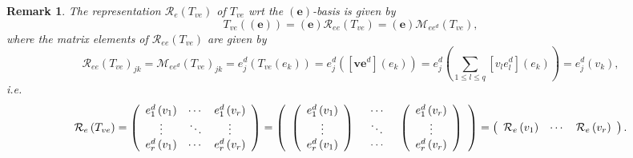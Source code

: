 \documentclass[aps,preprint]{revtex4}%
\newtheorem{remark}[theorem]{Remark}
\begin{document}
\begin{remark}
The representation $\mathcal{R}_{e}\left(  T_{ve}\right)  $ of $T_{ve}$ wrt
the $\left(  \mathbf{e}\right)  $-basis is given by
\begin{equation}
T_{ve}\left(  \left(  \mathbf{e}\right)  \right)  =\left(  \mathbf{e}\right)
\mathcal{R}_{ee}\left(  T_{ve}\right)  =\left(  \mathbf{e}\right)
\mathcal{M}_{ee^{d}}\left(  T_{ve}\right)  ,
\end{equation}
where the matrix elements of $\mathcal{R}_{ee}\left(  T_{ve}\right)  $ are
given by
\begin{equation}
\mathcal{R}_{ee}\left(  T_{ve}\right)  _{jk}=\mathcal{M}_{ee^{d}}\left(
T_{ve}\right)  _{jk}=e_{j}^{d}\left(  T_{ve}\left(  e_{k}\right)  \right)
=e_{j}^{d}\left(  \left[  \boldsymbol{v}\mathbf{e}^{d}\right]  \left(
e_{k}\right)  \right)  =e_{j}^{d}\left(  \sum_{1\leq l\leq q}\left[
v_{l}e_{l}^{d}\right]  \left(  e_{k}\right)  \right)  =e_{j}^{d}\left(
v_{k}\right)  ,
\end{equation}
i.e.%
\begin{equation}
\mathcal{R}_{e}\left(  T_{ve}\right)  =\left(
\begin{array}
[c]{ccc}%
e_{1}^{d}\left(  v_{1}\right)  & \cdots & e_{1}^{d}\left(  v_{r}\right) \\
\vdots & \ddots & \vdots\\
e_{r}^{d}\left(  v_{1}\right)  & \cdots & e_{r}^{d}\left(  v_{r}\right)
\end{array}
\right)  =\left(
\begin{array}
[c]{ccc}%
\left(
\begin{array}
[c]{c}%
e_{1}^{d}\left(  v_{1}\right) \\
\vdots\\
e_{r}^{d}\left(  v_{1}\right)
\end{array}
\right)  &
\begin{array}
[c]{c}%
\cdots\\
\ddots\\
\cdots
\end{array}
& \left(
\begin{array}
[c]{c}%
e_{1}^{d}\left(  v_{r}\right) \\
\vdots\\
e_{r}^{d}\left(  v_{r}\right)
\end{array}
\right)
\end{array}
\right)  =\left(
\begin{array}
[c]{ccc}%
\mathcal{R}_{e}\left(  v_{1}\right)  & \cdots & \mathcal{R}_{e}\left(
v_{r}\right)
\end{array}
\right)  .
\end{equation}

\end{remark}
\end{document}

